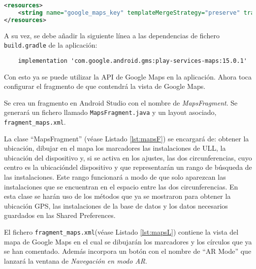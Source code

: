 \begin{lstlisting}[stringstyle=\color{purple},language=XML,caption={Fichero \texttt{google\_maps\_api.xml}.},  label={lst:apiMaps}]
<resources>
    <string name="google_maps_key" templateMergeStrategy="preserve" translatable="false">API_Maps</string>
</resources>
\end{lstlisting}
 
A su vez, se debe añadir la siguiente línea a las dependencias de fichero \texttt{build.gradle} de la aplicación:
 
\begin{lstlisting}
    implementation 'com.google.android.gms:play-services-maps:15.0.1'
\end{lstlisting}

Con esto ya se puede utilizar la API de Google Maps en la aplicación. Ahora toca configurar el fragmento de que contendrá la vista de Google Maps. 

Se crea un fragmento en Android Studio con el nombre de \textit{MapsFragment}. Se generará un fichero llamado \texttt{MapsFragment.java} y un layout asociado, \texttt{fragment\_maps.xml}.

La clase ``MapsFragment'' (véase Listado \ref{lst:mapsF}) se encargará de: obtener la ubicación, dibujar en el mapa los marcadores las instalaciones de ULL, la ubicación del dispositivo y, si se activa en los ajustes, las dos circunferencias, cuyo centro es la ubicacióndel dispositivo y que representarán un rango de búsqueda de las instalaciones. Este rango funcionará a modo de que solo aparezcan las instalaciones que se encuentran en el espacio entre las dos circunferencias. En esta clase se harán uso de los métodos que ya se mostraron para obtener la ubicación GPS, las instalaciones de la base de datos y los datos necesarios guardados en las Shared Preferences.   

\bigskip



El fichero \texttt{fragment\_maps.xml}(véase Listado \ref{lst:mapsL}) contiene la vista del mapa de Google Maps en el cual se dibujarán los marcadores y los círculos que ya se han comentado. Además incorpora un botón con el nombre de ``AR Mode'' que lanzará la ventana de \textit{Navegación en modo AR}.


    

